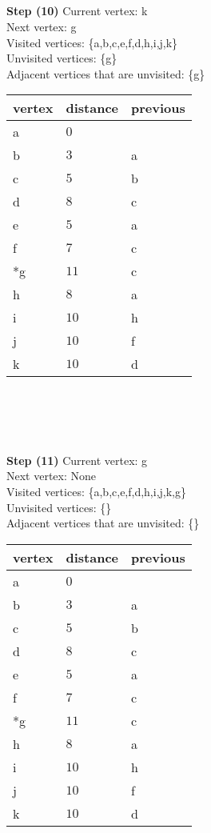 \documentclass[11pt]{article}
\begin{document}
\\ \\
\\ \\
\textbf{Step (10)} Current vertex: k\\
Next vertex: g\\
Visited vertices: \{a,b,c,e,f,d,h,i,j,k\}\\
Unvisited vertices: \{g\}\\
Adjacent vertices that are unvisited: \{g\}\\
\begin{tabular}{|l|l|l|}
    \hline
    vertex & distance & previous \\
    \hline
    a & $0$ &  \\
    \hline
    b & $3$ & a \\
    \hline
    c & $5$ & b \\
    \hline
    d & $8$ & c \\
    \hline
    e & $5$ & a \\
    \hline
    f & $7$ & c \\
    \hline
    *g & $11$ & c \\
    \hline
    h & $8$ & a \\
    \hline
    i & $10$ & h \\
    \hline
    j & $10$ & f \\
    \hline
    k & $10$ & d \\
    \hline
\end{tabular}
\\ \\
\\ \\
\textbf{Step (11)} Current vertex: g\\
Next vertex: None\\
Visited vertices: \{a,b,c,e,f,d,h,i,j,k,g\}\\
Unvisited vertices: \{\}\\
Adjacent vertices that are unvisited: \{\}\\
\begin{tabular}{|l|l|l|}
    \hline
    vertex & distance & previous \\
    \hline
    a & $0$ &  \\
    \hline
    b & $3$ & a \\
    \hline
    c & $5$ & b \\
    \hline
    d & $8$ & c \\
    \hline
    e & $5$ & a \\
    \hline
    f & $7$ & c \\
    \hline
    *g & $11$ & c \\
    \hline
    h & $8$ & a \\
    \hline
    i & $10$ & h \\
    \hline
    j & $10$ & f \\
    \hline
    k & $10$ & d \\
    \hline
\end{tabular}
\end{document}
